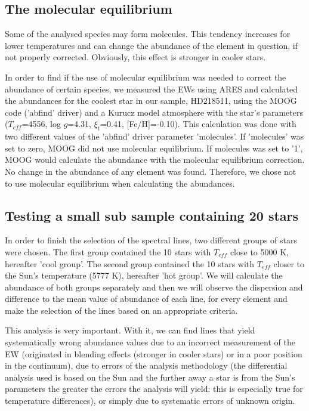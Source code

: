 \documentclass[dvips,12pt,a4paper]{report}
\begin{document}
{\subsection {The molecular equilibrium}

Some of the analysed species may form molecules. This tendency increases for lower temperatures and can change the abundance of the element in question, if not properly corrected. Obviously, this effect is stronger in cooler stars.

In order to find if the use of molecular equilibrium was needed to correct the abundance of certain species, we measured the EWs using ARES and calculated the abundances for the coolest star in our sample, HD218511, using the MOOG code ('abfind' driver) and a Kurucz model atmosphere with the star's parameters ($T_{eff}$=4556, log $g$=4.31, $\xi_t$=0.41, [Fe/H]=-0.10).  This calculation was done with two different values of the 'abfind' driver parameter 'molecules'. If 'molecules' was set to zero, MOOG did not use molecular equilibrium. If molecules was set to '1', MOOG would calculate the abundance with the molecular equilibrium correction. No change in the abundance of any element was found. Therefore, we chose not to use molecular equilibrium when calculating the abundances.

\subsection {Testing a small sub sample containing 20 stars} 
\label{20stars}
In order to finish the selection of the spectral lines, two different groups of stars were chosen. The first group contained the 10 stars with $T_{eff}$ close to 5000 K, hereafter 'cool group'. The second group contained the 10 stars with $T_{eff}$ closer to the Sun's temperature (5777 K), hereafter 'hot group'. We will calculate the abundance of both groups separately and then we will observe the dispersion and difference to the mean value of abundance of each line, for every element and make the selection of the lines based on an appropriate criteria. %

This analysis is very important. With it, we can find lines that yield systematically wrong abundance values due to an incorrect measurement of the EW (originated in blending effects (stronger in cooler stars) or in a poor position in the continuum), due to errors of the analysis methodology (the differential analysis used is based on the Sun and the further away a star is from the Sun's parameters the greater the errors the analysis will yield: this is especially true for temperature differences), or simply due to systematic errors of unknown origin.

}
\end{document}
